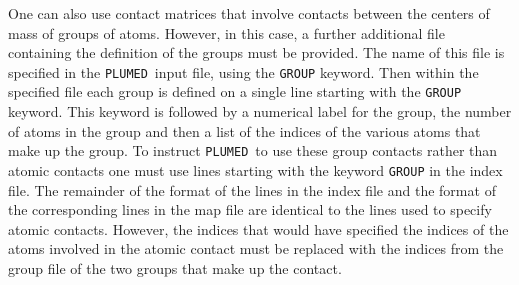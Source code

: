 \documentclass[12pt,fleqn]{report}
\newcommand{\plumed}{{\tt PLUMED}}
\begin{document}
One can also use contact matrices that involve
contacts between the centers of mass of groups of atoms.
However, in this case, a further additional file containing the definition of the groups must
be provided.  The name of this file is specified in the \plumed \  input file, using the {\tt GROUP} keyword.
Then within the specified file each group is defined on a single line starting with the {\tt GROUP} keyword.
This keyword is followed by a numerical label for the group, the number of atoms in the group and then a list
of the indices of the various atoms that make up the group.  To instruct \plumed \ to use these group contacts 
rather than atomic contacts one must use lines starting with the keyword {\tt GROUP} in the index file.  The 
remainder of the format of the lines in the index file and the format of the corresponding lines in the 
map file are identical to the lines used to specify atomic contacts.  However, the indices that would have 
specified the indices of the atoms involved in the atomic contact must be replaced with the indices from the
group file of the two groups that make up the contact.
\end{document}
